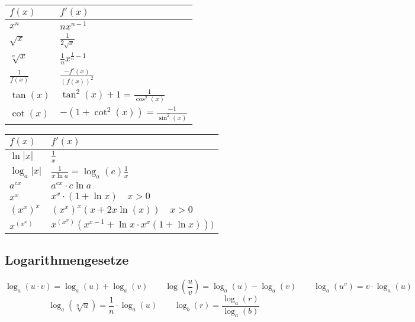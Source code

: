 \documentclass[a4paper,10pt]{scrartcl}
\begin{document}
\begin{multicols}{2}
	\renewcommand\arraystretch{1.4}
	\begin{tabular}{l|l}
		$f(x)$ & $f'(x)$ \\ \hline
		
		$ x^n $   &   $ nx^{n-1} $ \\
		$ \sqrt x $  &  $ \frac{1}{2 \sqrt x} $ \\
		$ \sqrt[n] x $  &  $ \frac{1}{n} {x}^{ \frac{1}{n} -1 } $ \\
		$ \frac{1}{f(x)} $  &  $ \frac{-f'(x)}{(f(x))^2} $ \\
		$ \tan(x) $  &  $ \tan^2(x)+1 = \frac{1}{\cos^2(x)} $ \\
		$ \cot(x) $  &  $ -(1 + \cot^2(x)) = \frac{-1}{\sin^2(x)} $
	\end{tabular}
	
	\columnbreak
	\hspace{-20pt}
	\begin{tabular}{l|l}
		$f(x)$ & $f'(x)$ \\ \hline
		
		$ \ln |x| $  &  $ \frac{1}{x} $ \\
		$ \log_a |x| $  &  $ \frac{1}{x \ln a} = \log_a(e) \frac{1}{x} $ \\
		$ a^{cx} $  &  $ a^{cx} \cdot c \ln a $ \\
		$ x^x $  &  $ x^x \cdot (1+\ln x) \quad \scriptstyle x > 0 $ \\
		$ (x^x)^x $  &  $ (x^x)^x(x+2x\ln(x)) \quad \scriptstyle x > 0 $ \\
		$ x^{(x^x)} $  &  $ x^{(x^x)}(x^{x-1}+\ln x \cdot x^x (1+\ln x))) $ 
	\end{tabular}
\end{multicols}

	\subsection{Logarithmengesetze}
	\begin{equation*}
		\log_a(u\cdot v) = \log_a(u) + \log_a(v) \qquad 
		\log\left(\frac{u}{v}\right) = \log_a(u) - \log_a(v) \qquad
		\log_a(u^v) = v\cdot \log_a(u)
	\end{equation*}
	\begin{equation*}
		\log_a(\sqrt[n]{u}) = \frac{1}{n} \cdot \log_a(u) \qquad
		\log_b(r) = \frac{\log_a(r)}{\log_a(b)}
	\end{equation*}
\end{document}
